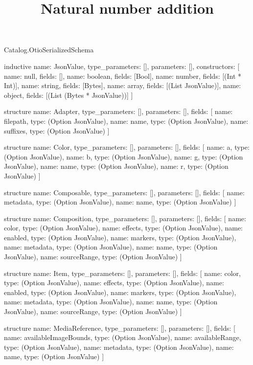\begin{lexlean}{Catalog.OtioSerializedSchema}
\title{Natural number addition}
\begin{semanticmodule}
inductive{
  name: JsonValue,
  type_parameters: [],
  parameters: [],
  constructors: [
    {name: null, fields: []},
    {name: boolean, fields: [Bool]},
    {name: number, fields: [(Int * Int)]},
    {name: string, fields: [Bytes]},
    {name: array, fields: [(List JsonValue)]},
    {name: object, fields: [(List (Bytes * JsonValue))]}
  ]
}

structure{
  name: Adapter,
  type_parameters: [],
  parameters: [],
  fields: [
    {name: filepath, type: (Option JsonValue)},
    {name: name, type: (Option JsonValue)},
    {name: suffixes, type: (Option JsonValue)}
  ]
}

structure{
  name: Color,
  type_parameters: [],
  parameters: [],
  fields: [
    {name: a, type: (Option JsonValue)},
    {name: b, type: (Option JsonValue)},
    {name: g, type: (Option JsonValue)},
    {name: name, type: (Option JsonValue)},
    {name: r, type: (Option JsonValue)}
  ]
}

structure{
  name: Composable,
  type_parameters: [],
  parameters: [],
  fields: [
    {name: metadata, type: (Option JsonValue)},
    {name: name, type: (Option JsonValue)}
  ]
}

structure{
  name: Composition,
  type_parameters: [],
  parameters: [],
  fields: [
    {name: color, type: (Option JsonValue)},
    {name: effects, type: (Option JsonValue)},
    {name: enabled, type: (Option JsonValue)},
    {name: markers, type: (Option JsonValue)},
    {name: metadata, type: (Option JsonValue)},
    {name: name, type: (Option JsonValue)},
    {name: sourceRange, type: (Option JsonValue)}
  ]
}

structure{
  name: Item,
  type_parameters: [],
  parameters: [],
  fields: [
    {name: color, type: (Option JsonValue)},
    {name: effects, type: (Option JsonValue)},
    {name: enabled, type: (Option JsonValue)},
    {name: markers, type: (Option JsonValue)},
    {name: metadata, type: (Option JsonValue)},
    {name: name, type: (Option JsonValue)},
    {name: sourceRange, type: (Option JsonValue)}
  ]
}

structure{
  name: MediaReference,
  type_parameters: [],
  parameters: [],
  fields: [
    {name: availableImageBounds, type: (Option JsonValue)},
    {name: availableRange, type: (Option JsonValue)},
    {name: metadata, type: (Option JsonValue)},
    {name: name, type: (Option JsonValue)}
  ]
}


\end{semanticmodule}
\end{lexlean}
